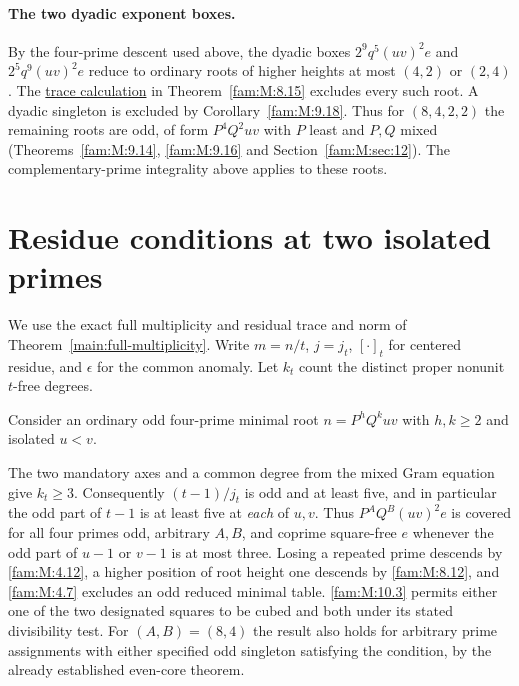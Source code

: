 \documentclass[11pt,a4paper]{article}
\numberwithin{equation}{section}
\theoremstyle{remark}
\begin{document}
\paragraph{The two dyadic exponent boxes.}\label{fam:W:dyadic-boxes}
By the four-prime descent used above, the dyadic boxes
$2^9q^5(uv)^2 e$ and $2^5q^9(uv)^2 e$ reduce to ordinary roots
of higher heights at most $(4,2)$ or $(2,4)$. The \href{https://github.com/sebastienpalcoux/WGT-fusion-categories/blob/f7f9f9a02f3116e61eb9dca4eebfed77001494e8/code/four_primes/dyadic_total_height.py}{trace calculation} in Theorem~\ref{fam:M:8.15} excludes every such root. A dyadic singleton is excluded by
Corollary~\ref{fam:M:9.18}. Thus for $(8,4,2,2)$ the remaining
roots are odd, of form $P^4Q^2uv$ with $P$ least and $P,Q$ mixed
(Theorems~\ref{fam:M:9.14}, \ref{fam:M:9.16} and
Section~\ref{fam:M:sec:12}). The complementary-prime integrality
above applies to these roots.

\section{Residue conditions at two isolated primes}\label{sub:residue-lift}
We use the exact full multiplicity and residual trace and norm of
Theorem~\ref{main:full-multiplicity}. Write $m=n/t$, $j=j_t$,
$[\cdot]_t$ for centered residue, and $\epsilon$ for the common anomaly.
Let $k_t$ count the distinct proper nonunit $t$-free degrees.

Consider an ordinary odd four-prime minimal root $n=P^hQ^k uv$
with $h,k\ge2$ and isolated $u<v$.

The two mandatory
axes and a common degree from the mixed Gram equation give $k_t\ge3$.
Consequently $(t-1)/j_t$ is odd and at least five, and in particular
the odd part of $t-1$ is at least five at \emph{each} of $u,v$.
Thus $P^A Q^B(uv)^2 e$ is covered for all four primes odd, arbitrary
$A,B$, and coprime square-free $e$ whenever the odd part of $u-1$ or
$v-1$ is at most three. Losing a repeated prime descends by \ref{fam:M:4.12},
a higher position of root height one descends by \ref{fam:M:8.12}, and \ref{fam:M:4.7}
excludes an odd reduced minimal table. \ref{fam:M:10.3} permits either one of
the two designated squares to be cubed and both under its stated
divisibility test. For $(A,B)=(8,4)$ the result also holds for
arbitrary prime assignments with either specified odd singleton
satisfying the condition, by the already established even-core theorem.
\end{document}
